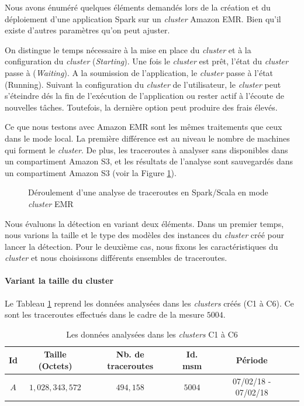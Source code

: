 Nous avons énuméré quelques éléments demandés lors de la création et du déploiement d'une application Spark sur un \textit{cluster} Amazon EMR. Bien  qu'il existe d'autres paramètres qu'on peut ajuster. 

On distingue le temps nécessaire à la mise en place du \textit{cluster} et à la configuration du \textit{cluster} (\textit{Starting}). Une fois le \textit{cluster} est prêt, l'état du \textit{cluster} passe à (\textit{Waiting}).  A la soumission de l'application, le \textit{cluster} passe à l'état (Running). Suivant la configuration du \textit{cluster} de l'utilisateur, le \textit{cluster} peut s'éteindre dés la fin de l'exécution de l'application ou rester actif à l'écoute de nouvelles tâches. Toutefois, la dernière option peut produire des frais élevés.  


Ce que nous testons avec Amazon EMR sont les mêmes traitements que ceux dans le mode local. La première  différence est au niveau le nombre de machines qui forment le \textit{cluster}.   De plus, les traceroutes à analyser sans disponibles dans un compartiment Amazon S3, et les résultats de l'analyse sont sauvegardés dans un compartiment Amazon S3 (voir la Figure \ref{fig:sparktimingEMR}). 


\begin{figure}[H]
	\centering
	\captionsetup{justification=centering}
	\resizebox{\textwidth}{!}{
		
	}
	\caption{Déroulement d'une analyse de  traceroutes en Spark/Scala en mode \textit{cluster} EMR}
	\label{fig:sparktimingEMR}
\end{figure}

Nous évaluons la détection en variant deux éléments. Dans un premier temps, nous varions la taille et le type des modèles des instances du \textit{cluster} créé pour lancer la détection. Pour le deuxième cas, nous fixons les caractéristiques du \textit{cluster} et  nous choisissons différents ensembles de traceroutes. 

\paragraph{Variant la taille du cluster}

Le Tableau 	\ref{variantlesdonnes-fixeddata} reprend les données analysées dans les \textit{clusters} créés (C1 à C6). Ce sont les traceroutes effectués dans le cadre de la mesure $ 5004 $.

\begin{table}[H]
	\centering
		\begin{tabular}{c c c c c  c}
			\hline 
			\textbf{Id}	& \textbf{Taille (Octets)}  & \textbf{Nb. de traceroutes}  &\textbf{Id. msm}& \textbf{Période} \\ 
			\hline 
			$ A $	& $ 1,028,343,572 $ & $ 494,158 $ &   $ 5004 $ & 07/02/18 - 07/02/18 \\ 
			\hline 
		\end{tabular} 
	\caption{Les données analysées dans les \textit{clusters} C1 à C6 }
	\label{variantlesdonnes-fixeddata}
\end{table}

